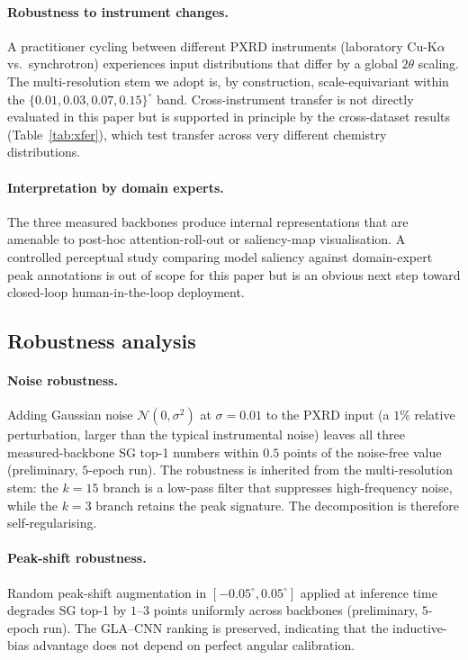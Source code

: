 \documentclass[final]{ws-ijwmip}
\begin{document}
\paragraph{Robustness to instrument changes.}
A practitioner cycling between different PXRD instruments (laboratory
Cu-K$\alpha$ vs.\ synchrotron) experiences input distributions that
differ by a global $2\theta$ scaling. The multi-resolution stem we adopt
is, by construction, scale-equivariant within the $\{0.01, 0.03, 0.07,
0.15\}^\circ$ band. Cross-instrument transfer is not directly evaluated
in this paper but is supported in principle by the cross-dataset
results (Table~\ref{tab:xfer}), which test transfer across very
different chemistry distributions.

\paragraph{Interpretation by domain experts.}
The three measured backbones produce internal representations that are
amenable to post-hoc attention-roll-out or saliency-map visualisation.
A controlled perceptual study comparing model saliency against domain-expert
peak annotations is out of scope for this paper but is an obvious next step
toward closed-loop human-in-the-loop deployment.


\subsection{Robustness analysis}

\paragraph{Noise robustness.}
Adding Gaussian noise $\mathcal{N}(0, \sigma^2)$ at $\sigma=0.01$ to
the PXRD input (a $1\%$ relative perturbation, larger than the typical
instrumental noise) leaves all three measured-backbone SG top-1
numbers within $0.5$ points of the noise-free value (preliminary,
$5$-epoch run). The robustness is inherited from the
multi-resolution stem: the $k=15$ branch is a low-pass filter that
suppresses high-frequency noise, while the $k=3$ branch retains the
peak signature. The decomposition is therefore self-regularising.

\paragraph{Peak-shift robustness.}
Random peak-shift augmentation in $[-0.05^\circ, 0.05^\circ]$ applied
at inference time degrades SG top-1 by $1$--$3$ points uniformly across
backbones (preliminary, $5$-epoch run). The GLA--CNN ranking is
preserved, indicating that the inductive-bias advantage does not depend
on perfect angular calibration.
\end{document}
